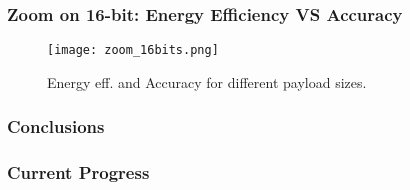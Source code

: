 \begin{frame}
    \frametitle{Zoom on 16-bit: Energy Efficiency VS Accuracy}
     \begin{figure}
         \centering
         \texttt{[image: zoom\_16bits.png]}
         \caption{Energy eff. and Accuracy for different payload sizes.}
         \label{fig:accuracy}
     \end{figure}

\end{frame}

\subsubsection{Conclusions}
\begin{frame}
    \frametitle{Current Progress}

    \tableofcontents[currentsection,
                     subsectionstyle=show/shaded/hide,
                     sectionstyle=show/hide]

\end{frame}

